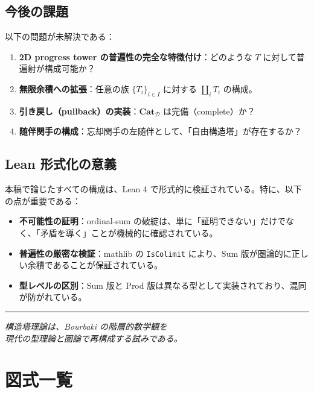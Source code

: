 \documentclass[a4paper,12pt]{ltjsarticle}
\theoremstyle{definition}
\begin{document}
\subsection{今後の課題}

以下の問題が未解決である：

\begin{enumerate}
    \item \textbf{2D progress tower の普遍性の完全な特徴付け}：どのような $T$ に対して普遍射が構成可能か？
    \item \textbf{無限余積への拡張}：任意の族 $\{T_i\}_{i \in I}$ に対する $\coprod_i T_i$ の構成。
    \item \textbf{引き戻し（pullback）の実装}：$\mathbf{Cat}_{\mathcal{D}}$ は完備（complete）か？
    \item \textbf{随伴関手の構成}：忘却関手の左随伴として、「自由構造塔」が存在するか？
\end{enumerate}

\subsection{Lean 形式化の意義}

本稿で論じたすべての構成は、Lean 4 で形式的に検証されている。特に、以下の点が重要である：

\begin{itemize}
    \item \textbf{不可能性の証明}：ordinal-sum の破綻は、単に「証明できない」だけでなく、「矛盾を導く」ことが機械的に確認されている。
    \item \textbf{普遍性の厳密な検証}：mathlib の \texttt{IsColimit} により、Sum 版が圏論的に正しい余積であることが保証されている。
    \item \textbf{型レベルの区別}：Sum 版と Prod 版は異なる型として実装されており、混同が防がれている。
\end{itemize}

\begin{center}
\rule{0.5\textwidth}{0.4pt}
\end{center}

\begin{center}
\textit{構造塔理論は、Bourbaki の階層的数学観を\\現代の型理論と圏論で再構成する試みである。}
\end{center}

\appendix

\section{図式一覧}
\end{document}
